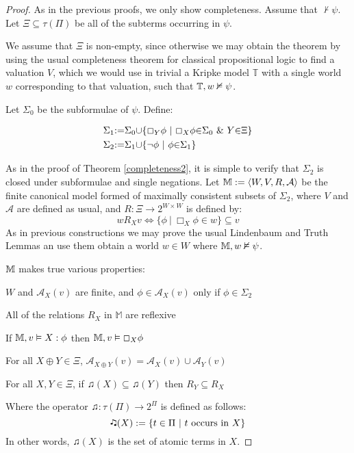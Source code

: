 \begin{proof}
  As in the previous proofs, we only show completeness.  Assume that $\nvdash
  \psi$.  Let $\Xi \subseteq \tau (\Pi)$ be all of the subterms occurring in
  $\psi$. 

  We assume that $\Xi$ is non-empty, since otherwise we may obtain the
  theorem by using the usual completeness theorem for classical propositional
  logic to find a valuation $V$, which we would use in trivial a
  Kripke model $\mathbb{T}$ with a
  single world $w$ corresponding to that valuation, such that
  $\mathbb{T},w\nmodels \psi$. 

Let $\Sigma_0$ be the subformulae of $\psi$.  Define:
  
  \begin{align*}
    {\Sigma}_1 &
    {\assign}{\Sigma}_0{\cup}\{\Box_Y{\phi}{\ }|{\ }\Box_X{\phi}{\in}{\Sigma}_0{\ }\&{\ }Y{\in}{\Xi}\}\\
    {\Sigma}_2 &
    {\assign}{\Sigma}_1{\cup}\{{\neg}{\phi}{\ }|{\ }{\phi}{\in}{\Sigma}_1\}
  \end{align*}
  
  As in the proof of Theorem \ref{completeness2}, it is simple to verify that
  $\Sigma_2$ is closed under subformulae and single negations.  Let
  $\mathbbm{M} \assign \langle W, V, R, \mathcal{A} \rangle$ be the finite
  canonical model formed of maximally consistent subsets of $\Sigma_2$, where
  $V$ and $\mathcal{A}$ are defined as usual, and $R : \Xi \rightarrow 2^{W
  \times W}$ is defined by:
  \[ w R_X v \Longleftrightarrow \{\phi \  | \  \Box_X
     \phi \in w\} \subseteq v \]
  As in previous constructions we may prove the usual Lindenbaum and Truth
  Lemmas an use them obtain a world $w \in W$ where $\mathbbm{M}, w \nvDash
  \psi$.
   
 $\mathbbm{M}$ makes true various properties:
  \begin{enumeratenumeric}
     \item \label{fin}$W$ and $\mathcal{A}_X (v)$ are finite, and $\phi \in
    \mathcal{A}_X (v)$ only if $\phi \in \Sigma_2$
     \item All of the relations $R_X$ in $\mathbb{M}$ are reflexive    
    \item If $\mathbbm{M}, v \vDash X : \phi$ then $\mathbbm{M}, v \vDash
    \Box_X \phi$
    \item \label{union}For all $X \oplus Y \in \Xi$, $\mathcal{A}_{X \oplus
    Y}(v) = \mathcal{A}_X(v) \cup \mathcal{A}_Y (v)$
    \item \label{sub}For all $X, Y \in \Xi$, if $\twonotes (X) \subseteq
    \twonotes (Y)$ then $R_Y \subseteq R_X$
  \end{enumeratenumeric}
  Where the operator $\twonotes : \tau (\Pi) \rightarrow 2^{\Pi}$ is
  defined as follows:
  \[ \twonotes (X) \assign \{t \in \Pi \  | \  t \text{
     occurs in } X\} \]
  In other words, $\twonotes (X)$ is the set of atomic terms in $X$. 


\end{proof}
